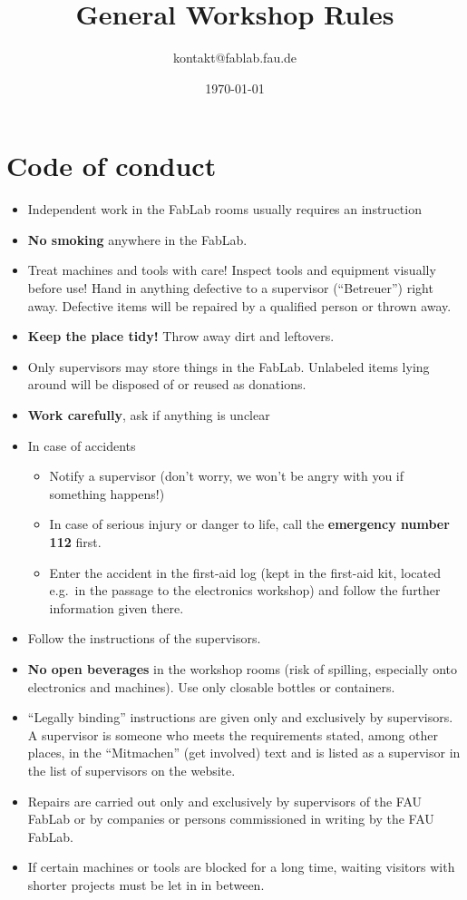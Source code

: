 \documentclass[13pt]{\basedir/fablab-document}
\date{\today}
\author{kontakt@fablab.fau.de}
\title{General Workshop Rules}
\begin{document}

\maketitle

\vbox{\vspace{1cm}}


\section{Code of conduct}
\begin{itemize}
  \item Independent work in the FabLab rooms usually requires an instruction
  \item \textbf{No smoking} anywhere in the FabLab.
  \item Treat machines and tools with care! Inspect tools and equipment visually before use! Hand in anything defective to a supervisor (\enquote{Betreuer}) right away. Defective items will be repaired by a qualified person or thrown away.
  \item \textbf{Keep the place tidy!} Throw away dirt and leftovers.
  \item Only supervisors may store things in the FabLab. Unlabeled items lying around will be disposed of or reused as donations.
  \item \textbf{Work carefully}, ask if anything is unclear
  \item In case of accidents
  \begin{itemize}
  	\item Notify a supervisor (don't worry, we won't be angry with you if something happens!)
  	\item In case of serious injury or danger to life, call the \textbf{emergency number 112} first.
  	\item Enter the accident in the first-aid log (kept in the first-aid kit, located e.g.\ in the passage to the electronics workshop) and follow the further information given there.
  \end{itemize}
  \item Follow the instructions of the supervisors.
  \item \textbf{No open beverages} in the workshop rooms (risk of spilling, especially onto electronics and machines). Use only closable bottles or containers.
  \item \enquote{Legally binding} instructions are given only and exclusively by supervisors. A supervisor is someone who meets the requirements stated, among other places, in the \enquote{Mitmachen} (get involved) text and is listed as a supervisor in the list of supervisors on the website.
  \item Repairs are carried out only and exclusively by supervisors of the FAU FabLab or by companies or persons commissioned in writing by the FAU FabLab.
  \item If certain machines or tools are blocked for a long time, waiting visitors with shorter projects must be let in in between.
\end{itemize}
\vbox{\vspace{0,5cm}}
\end{document}
